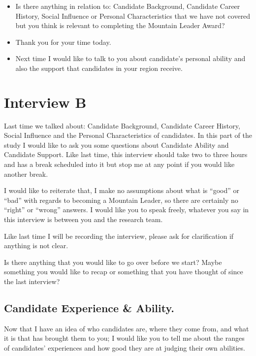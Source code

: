 \documentclass[
  12pt,
  a4paper,
]{book}
\providecommand{\tightlist}{%
  \setlength{\itemsep}{0pt}\setlength{\parskip}{0pt}}
\begin{document}
\begin{itemize}
\tightlist
\item
  Is there anything in relation to: Candidate Background, Candidate Career History, Social Influence or Personal Characteristics that we have not covered but you think is relevant to completing the Mountain Leader Award?
\item
  Thank you for your time today.
\item
  Next time I would like to talk to you about candidate's personal ability and also the support that candidates in your region receive.
\end{itemize}

\hypertarget{interview-b}{%
\section{Interview B}\label{interview-b}}

Last time we talked about: Candidate Background, Candidate Career History, Social Influence and the Personal Characteristics of candidates. In this part of the study I would like to ask you some questions about Candidate Ability and Candidate Support. Like last time, this interview should take two to three hours and has a break scheduled into it but stop me at any point if you would like another break.

I would like to reiterate that, I make no assumptions about what is ``good'' or ``bad'' with regards to becoming a Mountain Leader, so there are certainly no ``right'' or ``wrong'' answers. I would like you to speak freely, whatever you say in this interview is between you and the research team.

Like last time I will be recording the interview, please ask for clarification if anything is not clear.

Is there anything that you would like to go over before we start? Maybe something you would like to recap or something that you have thought of since the last interview?

\hypertarget{candidate-experience-ability.}{%
\subsection{Candidate Experience \& Ability.}\label{candidate-experience-ability.}}

Now that I have an idea of who candidates are, where they come from, and what it is that has brought them to you; I would like you to tell me about the ranges of candidates' experiences and how good they are at judging their own abilities.
\end{document}
